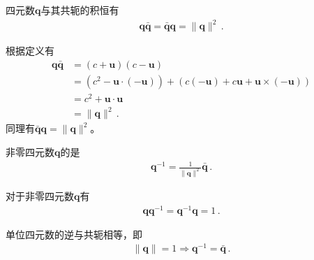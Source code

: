\begin{proposition}
    四元数${\bm q}$与其共轭的积恒有
    \begin{align}
        {\bm q}\bar{\bm q}=\bar{\bm q}{\bm q}=\|{\bm q}\|^2\, .
    \end{align}
\end{proposition}
\begin{prove}
    根据定义有
    \begin{align}
        {\bm q}\bar{\bm q} & =(c+{\bm u})(c-{\bm u})\nonumber                                                      \\
                           & =(c^2-{\bm u}\cdot(-{\bm u}))+(c(-{\bm u})+c{\bm u}+{\bm u}\times(-{\bm u}))\nonumber \\
                           & =c^2+{\bm u}\cdot{\bm u}\nonumber                                                     \\
                           & =\|{\bm q}\|^2\, .
    \end{align}
    同理有$\bar{\bm q}{\bm q}=\|{\bm q}\|^2$。
\end{prove}
\begin{definition}
    非零四元数${\bm q}$的是
    \begin{align}
        {\bm q}^{-1}=\frac{1}{\|{\bm q}\|^2}\bar{\bm q}\, .
    \end{align}
\end{definition}
\begin{corollary}
    对于非零四元数${\bm q}$有
    \begin{align}
        {\bm q}{\bm q}^{-1}={\bm q}^{-1}{\bm q}=1\, .
    \end{align}
\end{corollary}
\begin{corollary}
    单位四元数的逆与共轭相等，即
    \begin{align}
        \|{\bm q}\|=1 \Rightarrow {\bm q}^{-1}=\bar{\bm q}\, .
    \end{align}
\end{corollary}
